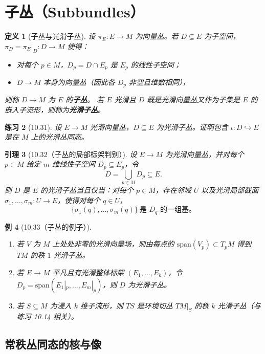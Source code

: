 \documentclass[12pt]{article}
\newtheorem{definition}{定义}[section]
\newtheorem{lemma}[definition]{引理}
\newtheorem{example}[definition]{例}
\newtheorem{exercise}[definition]{练习}
\begin{document}
\section{子丛（Subbundles）}

\begin{definition}[子丛与光滑子丛]
设 $\pi_E:E\to M$ 为向量丛。若 $D\subseteq E$ 为子空间，$\pi_D=\pi_E|_D:D\to M$ 使得：
\begin{itemize}
\item 对每个 $p\in M$，$D_p=D\cap E_p$ 是 $E_p$ 的线性子空间；
\item $D\to M$ 本身为向量丛（因此各 $D_p$ 非空且维数相同），
\end{itemize}
则称 $D\to M$ 为 $E$ 的\textbf{子丛}。
若 $E$ 光滑且 $D$ 既是光滑向量丛又作为子集是 $E$ 的嵌入子流形，则称为\textbf{光滑子丛}。
\end{definition}

\begin{exercise}[10.31]
设 $E\to M$ 光滑向量丛，$D\subseteq E$ 为光滑子丛。证明包含 $\iota:D\hookrightarrow E$ 是在 $M$ 上的光滑丛同态。
\end{exercise}

\begin{lemma}[10.32（子丛的局部标架判别）]
设 $E\to M$ 为光滑向量丛，并对每个 $p\in M$ 给定 $m$ 维线性子空间 $D_p\subseteq E_p$，令
\[
D=\bigcup_{p\in M}D_p\subseteq E.
\]
则 $D$ 是 $E$ 的光滑子丛当且仅当：对每个 $p\in M$，存在邻域 $U$ 以及光滑局部截面 $\sigma_1,\dots,\sigma_m:U\to E$，使得对每个 $q\in U$，
\[
\{\sigma_1(q),\dots,\sigma_m(q)\}\ \text{是 }D_q\text{ 的一组基。}
\]
\end{lemma}

\begin{example}[10.33（子丛的例子）]
\begin{enumerate}[label=(\alph*)]
\item 若 $V$ 为 $M$ 上处处非零的光滑向量场，则由每点的 $\mathrm{span}(V_p)\subset T_pM$ 得到 $TM$ 的秩 $1$ 光滑子丛。
\item 若 $E\to M$ 平凡且有光滑整体标架 $(E_1,\dots,E_k)$，令 $D_p=\mathrm{span}(E_1|_p,\dots,E_m|_p)$，则 $D$ 为光滑子丛。
\item 若 $S\subseteq M$ 为浸入 $k$ 维子流形，则 $TS$ 是环境切丛 $TM|_S$ 的秩 $k$ 光滑子丛（与练习 10.14 相关）。
\end{enumerate}
\end{example}

\subsection{常秩丛同态的核与像}
\end{document}
